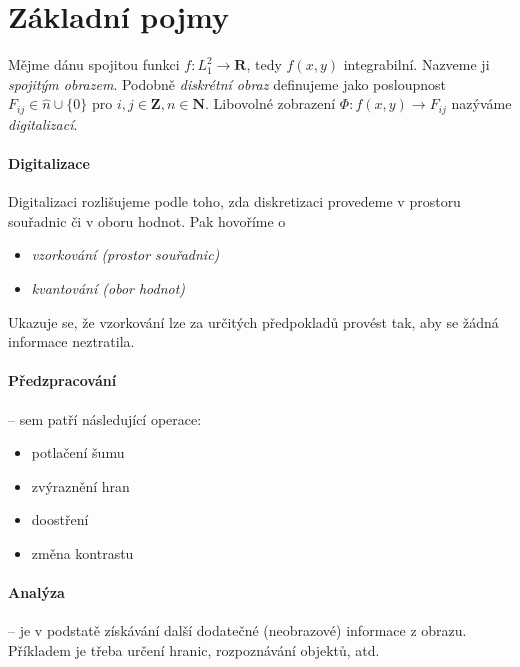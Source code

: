 \def\R{\mathbf{R}}
\def\N{\mathbf{N}}
\def\L{\mathbf{L}}
\def\Z{\mathbf{Z}}

\def\bcirc{\mathbin{\mathpalette\makebcirc{\circ}}} 
\def\bast{\mathbin{\mathpalette\makebcirc{\ast}}}
\def\msurr{\mathsurround=0pt}
\def\makebcirc#1#2{%
   \ooalign{$#1\bigcirc\msurr$\cr \hfil$#1#2\msurr$\hfil}}

\def\corr{\bast}
\def\conv{\ast}

\section{Základní pojmy}

Mějme dánu spojitou funkci $f:L_1^2\rightarrow \R$, tedy $f(x,y)$ integrabilní. Nazveme ji {\em spojitým obrazem}.
Podobně {\em diskrétní obraz} definujeme jako posloupnost $F_{ij}\in \hat{n}\cup \{0\}$ pro $i,j\in\Z,n\in\N$.
Libovolné zobrazení $\Phi: f(x,y)\rightarrow F_{ij}$ nazýváme {\em digitalizací}.



\paragraph{Digitalizace}


Digitalizaci rozlišujeme podle toho, zda diskretizaci provedeme v prostoru souřadnic či v oboru hodnot. Pak hovoříme o
 \begin{itemize}
\item {\em vzorkování (prostor souřadnic)}
\item {\em kvantování (obor hodnot)}
 \end{itemize}

 Ukazuje se, že vzorkování lze za určitých předpokladů provést tak, aby se žádná informace neztratila.
 
\paragraph{Předzpracování} -- sem patří následující operace:
 
 \begin{itemize}
\item potlačení šumu
\item zvýraznění hran
\item doostření
\item změna kontrastu
 \end{itemize}

\paragraph{Analýza} -- je v podstatě získávání další dodatečné (neobrazové) informace z obrazu. Příkladem je třeba
určení hranic, rozpoznávání objektů, atd.

